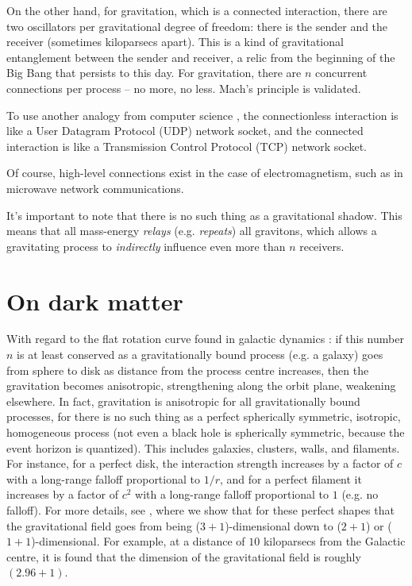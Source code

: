 \documentclass[12pt]{article}
\begin{document}
{On the other hand, for gravitation, which is a connected interaction, there are two oscillators per gravitational degree of freedom: there is the sender and the receiver (sometimes kiloparsecs apart).
This is a kind of gravitational entanglement between the sender and receiver, a relic from the beginning of the Big Bang that persists to this day.
For gravitation, there are $n$ concurrent connections per process -- no more, no less.
Mach's principle \cite{misner} is validated.

To use another analogy from computer science \cite{stevens}, the connectionless interaction is like a User Datagram Protocol (UDP) network socket, and the connected interaction is like a Transmission Control Protocol (TCP) network socket.

Of course, high-level connections exist in the case of electromagnetism, such as in microwave network communications.

It's important to note that there is no such thing as a gravitational shadow.
This means that all mass-energy {\textit{relays}} (e.g. {\textit{repeats}}) all gravitons, which allows a gravitating process to {\textit{indirectly}} influence even more than $n$ receivers.





\section{On dark matter}

With regard to the flat rotation curve found in galactic dynamics \cite{binney}: if this number $n$ is at least conserved as a gravitationally bound process (e.g. a galaxy) goes from sphere to disk as distance from the process centre increases, then the gravitation becomes anisotropic, strengthening along the orbit plane, weakening elsewhere.
In fact, gravitation is anisotropic for all gravitationally bound processes, for there is no such thing as a perfect spherically symmetric, isotropic, homogeneous process (not even a black hole is spherically symmetric, because the event horizon is quantized).
This includes galaxies, clusters, walls, and filaments.
For instance, for a perfect disk, the interaction strength increases by a factor of $c$ with a long-range falloff proportional to $1/r$, and for a perfect filament it increases by a factor of $c^2$ with a long-range falloff proportional to $1$ (e.g. no falloff).
For more details, see \cite{halayka}, where we show that for these perfect shapes that the gravitational field goes from being ($3+1$)-dimensional down to ($2+1$) or ($1+1$)-dimensional.
For example, at a distance of $10$ kiloparsecs from the Galactic centre, it is found that the dimension of the gravitational field is roughly $(2.96 + 1)$.

}
\end{document}
